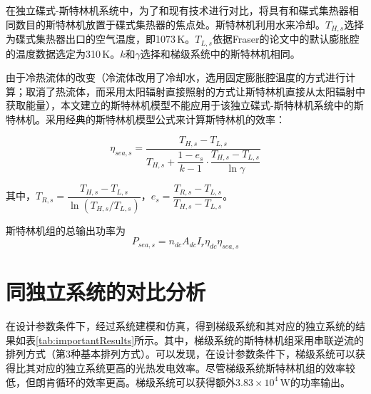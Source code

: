 在独立碟式-斯特林机系统中，为了和现有技术进行对比，将具有和碟式集热器相同数目的斯特林机放置于碟式集热器的焦点处。斯特林机利用水来冷却。$T_{H,s}$选择为碟式集热器出口的空气温度，即1073$\,\mathrm{K}$。$T_{L,s}$依据Fraser的论文\cite{Fraser2008}中的默认膨胀腔的温度数据选定为310$\,\mathrm{K}$。$k$和$\gamma$选择和梯级系统中的斯特林机相同。

由于冷热流体的改变（冷流体改用了冷却水，选用固定膨胀腔温度的方式进行计算；取消了热流体，而采用太阳辐射直接照射的方式让斯特林机直接从太阳辐射中获取能量），本文建立的斯特林机模型不能应用于该独立碟式-斯特林机系统中的斯特林机。采用经典的斯特林机模型公式来计算斯特林机的效率\cite{Stine1998}：

\begin{equation}
	\eta_{sea,s}=\dfrac{T_{H,s}-T_{L,s}}{T_{H,s}+\dfrac{1-e_{s}}{k-1}\cdot\dfrac{T_{H,s}-T_{L,s}}{\ln\gamma}}
\end{equation}

其中，$T_{R,s}=\dfrac{T_{H,s}-T_{L,s}}{\ln(T_{H,s}/T_{L,s})}$，$e_{s}=\dfrac{T_{R,s}-T_{L,s}}{T_{H,s}-T_{L,s}}$。

斯特林机组的总输出功率为
\begin{equation}
	P_{sea,s}=n_{dc}A_{dc}I_r\eta_{dc}\eta_{sea,s}
\end{equation}

\section{同独立系统的对比分析}

在设计参数条件下，经过系统建模和仿真，得到梯级系统和其对应的独立系统的结果如表\ref{tab:importantResults}所示。其中，梯级系统的斯特林机组采用串联逆流的排列方式（第3种基本排列方式）。可以发现，在设计参数条件下，梯级系统可以获得比其对应的独立系统更高的光热发电效率。尽管梯级系统斯特林机组的效率较低，但朗肯循环的效率更高。梯级系统可以获得额外$3.83\times10^4\,\mathrm{W}$的功率输出。

